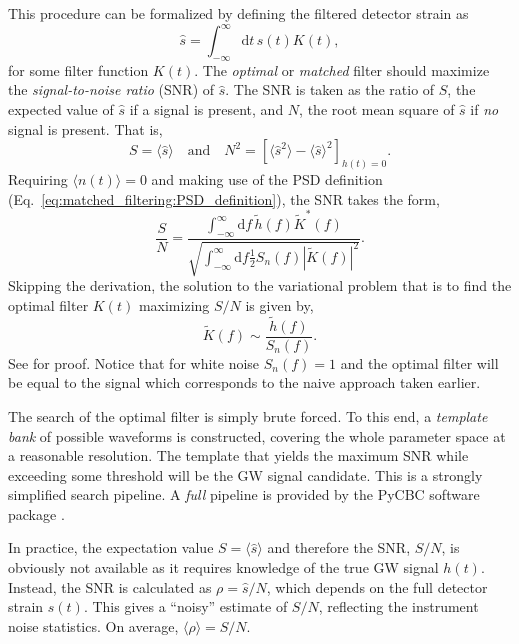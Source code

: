 This procedure can be formalized by defining the filtered detector strain as
\begin{equation}
	\label{eq:matched_filtering:filtered_strain}
	\hat{s} = \int_{-\infty}^\infty \mathrm{d}t\,s(t)K(t),
\end{equation}
for some filter function $K(t)$. The \emph{optimal} or \emph{matched} filter should maximize the \emph{signal-to-noise ratio} (SNR) of $\hat{s}$. The SNR is taken as the ratio of $S$, the expected value of $\hat{s}$ if a signal is present, and $N$, the root mean square of $\hat{s}$ if \emph{no} signal is present. That is,
\begin{equation}
	S = \langle\hat{s}\rangle \quad \text{and} \quad 
	N^2 = [\langle\hat{s}^2\rangle - \langle\hat{s}\rangle^2]_{h(t) = 0}.
\end{equation}
Requiring $\langle n(t)\rangle = 0$ and making use of the PSD definition (Eq.~\ref{eq:matched_filtering:PSD_definition}), the SNR takes the form,
\begin{equation}
	\label{eq:matched_filtering:snr}
	\frac{S}{N} 
	= \frac{\int_{-\infty}^\infty \mathrm{d}f\,\tilde{h}(f)\tilde{K}^*(f)}
	{\sqrt{\int_{-\infty}^\infty \mathrm{d}f\frac{1}{2}S_n(f)|\tilde{K}(f)|^2}}.
\end{equation}
Skipping the derivation, the solution to the variational problem that is to find the optimal filter $K(t)$ maximizing $S/N$ is given by,
\begin{equation}
	\tilde{K}(f) \sim \frac{\tilde{h}(f)}{S_n(f)}.
\end{equation}
See \cite{10.1093/acprof:oso/9780198570745.001.0001} for proof.
Notice that for white noise $S_n(f) = 1$ and the optimal filter will be equal to the signal which corresponds to the naive approach taken earlier. 

The search of the optimal filter is simply brute forced. To this end, a \emph{template bank} of possible waveforms is constructed, covering the whole parameter space at a reasonable resolution. The template that yields the maximum SNR while exceeding some threshold will be the GW signal candidate. This is a strongly simplified search pipeline. A \emph{full} pipeline is provided by the PyCBC software package \cite{alex_nitz_2023_10013996, Usman_2016}.  

In practice, the expectation value $S=\langle\hat{s}\rangle$ and therefore the SNR, $S/N$, is obviously not available as it requires knowledge of the true GW signal $h(t)$. Instead, the SNR is calculated as $\rho = \hat{s}/N$, which depends on the full detector strain $s(t)$. This gives a \enquote{noisy} estimate of $S/N$, reflecting the instrument noise statistics. On average, $\langle\rho\rangle = S/N$.

